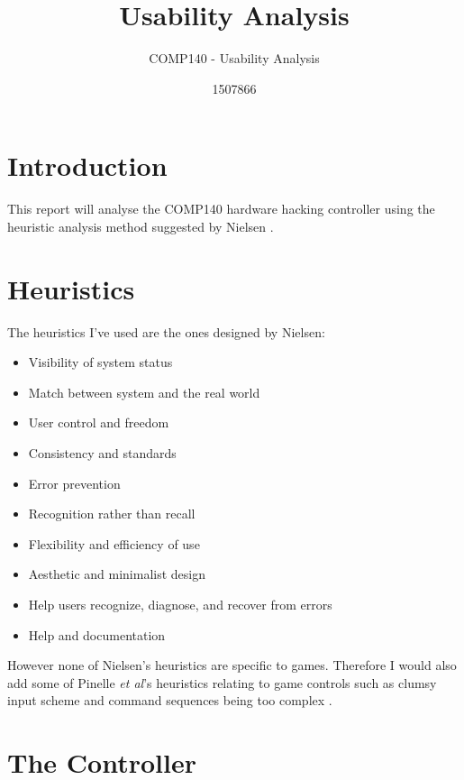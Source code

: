 \documentclass{scrartcl}
\title{Usability Analysis}
\subtitle{COMP140 - Usability Analysis}
\author{1507866}
\begin{document}
	
\maketitle


\section{Introduction}
This report will analyse the COMP140 hardware hacking controller using the heuristic analysis method suggested by Nielsen \cite{HeuristicEvaluation}.

\section{Heuristics}
The heuristics I've used are the ones designed by Nielsen:
\begin{itemize}
	\item Visibility of system status
	\item Match between system and the real world
	\item User control and freedom	
	\item Consistency and standards
	\item Error prevention
	\item Recognition rather than recall
	\item Flexibility and efficiency of use
	\item Aesthetic and minimalist design
	\item Help users recognize, diagnose, and recover from errors	
	\item Help and documentation \cite{NNG}
\end{itemize}

However none of Nielsen's heuristics are specific to games. Therefore I would also add some of Pinelle \textit{et al}'s heuristics relating to game controls such as clumsy input scheme and command sequences being too complex \cite{Pinelle}.

\section{The Controller}
\end{document}
